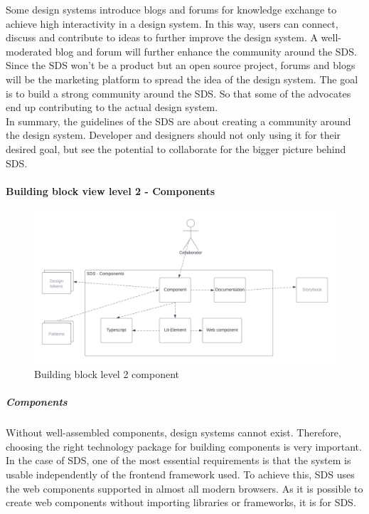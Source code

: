 Some design systems introduce blogs and forums for knowledge exchange to achieve high interactivity in a design system. In this way, users can connect, discuss and contribute to ideas to further improve the design system. A well-moderated blog and forum will further enhance the community around the \ac{SDS}. \\
Since the \ac{SDS} won't be a product but an open source project, forums and blogs will be the marketing platform to spread the idea of the design system. The goal is to build a strong community around the \ac{SDS}. So that some of the advocates end up contributing to the actual design system. \\
In summary, the guidelines of the \acl{SDS} are about creating a community around the design system. Developer and designers should not only using it for their desired goal, but see the potential to collaborate for the bigger picture behind \ac{SDS}.

\paragraph{Building block view level 2 - Components}
\begin{figure}[htbp]
    \centerline{
    \includegraphics[width=\linewidth]{images/building_block_view_level_2_component.png}}
\caption{Building block level 2 component}
\label{building_block_level_2_component_sds}
\end{figure}
\subparagraph{Components} \label{sds-component}
Without well-assembled components, design systems cannot exist. Therefore, choosing the right technology package for building components is very important. In the case of \ac{SDS}, one of the most essential requirements is that the system is usable independently of the frontend framework used. To achieve this, \ac{SDS} uses the web components supported in almost all modern browsers. As it is possible to create web components without importing libraries or frameworks, it is for \ac{SDS}. \citep{mdn_web_component_nodate} \\

